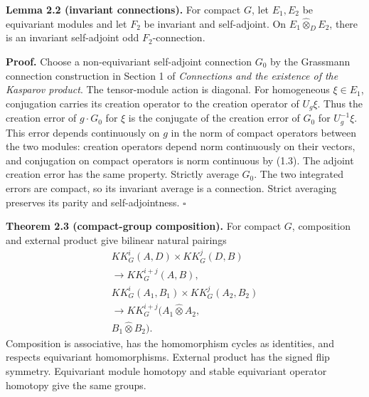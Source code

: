 \documentclass[
  11pt,
]{article}
\begin{document}
\textbf{Lemma 2.2 (invariant connections).} For compact \(G\), let
\(E_1,E_2\) be equivariant modules and let \(F_2\) be invariant and
self-adjoint. On \(E_1\widehat\otimes_D E_2\), there is an invariant
self-adjoint odd \(F_2\)-connection.

\textbf{Proof.} Choose a non-equivariant self-adjoint connection \(G_0\)
by the Grassmann connection construction in Section 1 of
\emph{Connections and the existence of the Kasparov product}. The
tensor-module action is diagonal. For homogeneous \(\xi\in E_1\),
conjugation carries its creation operator to the creation operator of
\(U_g\xi\). Thus the creation error of \(g\cdot G_0\) for \(\xi\) is the
conjugate of the creation error of \(G_0\) for \(U_g^{-1}\xi\). This
error depends continuously on \(g\) in the norm of compact operators
between the two modules: creation operators depend norm continuously on
their vectors, and conjugation on compact operators is norm continuous
by (1.3). The adjoint creation error has the same property. Strictly
average \(G_0\). The two integrated errors are compact, so its invariant
average is a connection. Strict averaging preserves its parity and
self-adjointness. \(\square\)

\textbf{Theorem 2.3 (compact-group composition).} For compact \(G\),
composition and external product give bilinear natural pairings \[
\begin{gathered}
KK_G^i(A,D)\times KK_G^j(D,B)\\
\longrightarrow KK_G^{i+j}(A,B),\\[3pt]
KK_G^i(A_1,B_1)\times KK_G^j(A_2,B_2)\\
\longrightarrow KK_G^{i+j}(A_1\widehat\otimes A_2,\\
 B_1\widehat\otimes B_2).
\end{gathered}
\tag{2.5}
\] Composition is associative, has the homomorphism cycles as
identities, and respects equivariant homomorphisms. External product has
the signed flip symmetry. Equivariant module homotopy and stable
equivariant operator homotopy give the same groups.
\end{document}
